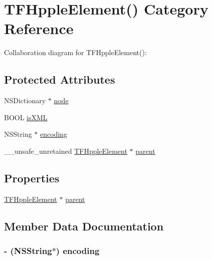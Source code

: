 \hypertarget{category_t_f_hpple_element_07_08}{}\section{T\+F\+Hpple\+Element() Category Reference}
\label{category_t_f_hpple_element_07_08}


Collaboration diagram for T\+F\+Hpple\+Element()\+:
\subsection*{Protected Attributes}
\begin{DoxyCompactItemize}
\item 
N\+S\+Dictionary $\ast$ \hyperlink{category_t_f_hpple_element_07_08_a3742b005d3fd31acacff0d1573cb8a89}{node}
\item 
B\+O\+O\+L \hyperlink{category_t_f_hpple_element_07_08_a41941751fd0f1fdf6c18c0f90c5991cb}{is\+X\+M\+L}
\item 
N\+S\+String $\ast$ \hyperlink{category_t_f_hpple_element_07_08_a0a7ccc47e17245385fbaf177baad31bf}{encoding}
\item 
\+\_\+\+\_\+unsafe\+\_\+unretained \hyperlink{interface_t_f_hpple_element}{T\+F\+Hpple\+Element} $\ast$ \hyperlink{category_t_f_hpple_element_07_08_ac7602bad8a05294a6beecabe01e6e569}{parent}
\end{DoxyCompactItemize}
\subsection*{Properties}
\begin{DoxyCompactItemize}
\item 
\hyperlink{interface_t_f_hpple_element}{T\+F\+Hpple\+Element} $\ast$ \hyperlink{category_t_f_hpple_element_07_08_a3a570a7692ac21f8d4adc52b4c96756c}{parent}
\end{DoxyCompactItemize}


\subsection{Member Data Documentation}
\hypertarget{category_t_f_hpple_element_07_08_a0a7ccc47e17245385fbaf177baad31bf}{}
\subsubsection[{encoding}]{\setlength{\rightskip}{0pt plus 5cm}-\/ (N\+S\+String$\ast$) encoding\hspace{0.3cm}{\ttfamily [protected]}}\label{category_t_f_hpple_element_07_08_a0a7ccc47e17245385fbaf177baad31bf}
\hypertarget{category_t_f_hpple_element_07_08_a41941751fd0f1fdf6c18c0f90c5991cb}{}
